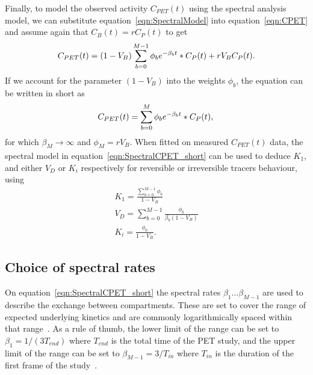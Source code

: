 Finally, to model the observed activity $C_{PET}(t)$ using the spectral analysis model, we can substitute equation~\ref{eqn:SpectralModel} into equation~\ref{eqn:CPET} and assume again that $C_{B}(t) = r C_{P}(t)$ to get
%
\begin{equation} 
{C_{PET}}(t)  = (1-V_{B}) \sum_{b=0}^{M-1} {\phi_b}  e^{-\beta_b t} \ast C_P(t) + r V_{B}  C_P(t)   \\ . \\
\label{eqn:SpectralCPET}
\end{equation}
%
If we account for the parameter $(1-V_{B})$ into the weights $\phi_b$, the equation can be written in short as 
%
\begin{equation} 
{C_{PET}}(t)  = \sum_{b=0}^{M} {\phi_b} e^{-\beta_b t} \ast C_P(t)   \\ , \\
\label{eqn:SpectralCPET_short}
\end{equation}
%
for which $\beta_M \xrightarrow[]{}\infty$ and $\phi_M = r V_{B}$. 
When fitted on measured ${C_{PET}}(t)$ data, the spectral model in equation~\ref{eqn:SpectralCPET_short} can be used to deduce $K_1$, and either $V_D$ or $K_i$ respectively for reversible or irreversible tracers behaviour, using
%
\begin{subequations}
\label{eqn:AllSpectralEqns}
\begin{align}
K_1 = \frac{\sum_{b=0}^{M-1} {\phi_b}}{1-{V_{B}}}   \\  
V_D = \sum_{b=0}^{M-1} \frac {\phi_b}{\beta_b (1-V_{B})} \\
K_i = \frac{\phi_0}{1-V_{B}} .
\end{align}
\label{eqn:SpectralCPET_AllEquations}
\end{subequations}
%
\subsection{Choice of spectral rates}
%
On equation~\ref{eqn:SpectralCPET_short} the spectral rates $\beta_1 ... \beta_{M-1}$ are used to describe the exchange between compartments. These are set to cover the range of expected underlying kinetics and are commonly logarithmically spaced within that range~\cite{Gunn2002}.
As a rule of thumb, the lower limit of the range can be set to $\beta_1 = 1/(3 T_{end})$ where $T_{end}$ is the total time of the PET study, and the upper limit of the range can be set to $\beta_{M-1} = 3/T_{in}$ where $T_{in}$ is the duration of the first frame of the study~\cite{Veronese2016}.

